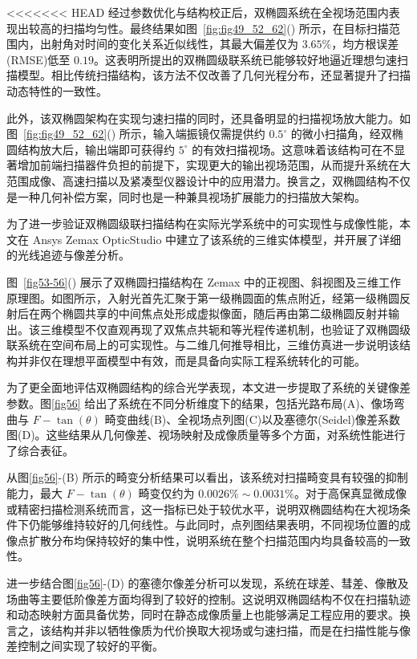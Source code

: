 <<<<<<< HEAD
经过参数优化与结构校正后，双椭圆系统在全视场范围内表现出较高的扫描均匀性。最终结果如图~\ref{fig:fig49_52_62}() 所示，在目标扫描范围内，出射角对时间的变化关系近似线性，其最大偏差仅为 $3.65\%$，均方根误差(RMSE)低至 $0.19$。这表明所提出的双椭圆级联系统已能够较好地逼近理想匀速扫描模型。相比传统扫描结构，该方法不仅改善了几何光程分布，还显著提升了扫描动态特性的一致性。

此外，该双椭圆架构在实现匀速扫描的同时，还具备明显的扫描视场放大能力。如图~\ref{fig:fig49_52_62}() 所示，输入端振镜仅需提供约 $0.5^\circ$ 的微小扫描角，经双椭圆结构放大后，输出端即可获得约 $5^\circ$ 的有效扫描视场。这意味着该结构可在不显著增加前端扫描器件负担的前提下，实现更大的输出视场范围，从而提升系统在大范围成像、高速扫描以及紧凑型仪器设计中的应用潜力。换言之，双椭圆结构不仅是一种几何补偿方案，同时也是一种兼具视场扩展能力的扫描放大架构。

为了进一步验证双椭圆级联扫描结构在实际光学系统中的可实现性与成像性能，本文在 Ansys Zemax OpticStudio 中建立了该系统的三维实体模型，并开展了详细的光线追迹与像差分析。

图~\ref{fig53-56}() 展示了双椭圆扫描结构在 Zemax 中的正视图、斜视图及三维工作原理图。如图所示，入射光首先汇聚于第一级椭圆面的焦点附近，经第一级椭圆反射后在两个椭圆共享的中间焦点处形成虚拟像面，随后再由第二级椭圆反射并输出。该三维模型不仅直观再现了双焦点共轭和等光程传递机制，也验证了双椭圆级联系统在空间布局上的可实现性。与二维几何推导相比，三维仿真进一步说明该结构并非仅在理想平面模型中有效，而是具备向实际工程系统转化的可能。

为了更全面地评估双椭圆结构的综合光学表现，本文进一步提取了系统的关键像差参数。图\ref{fig56} 给出了系统在不同分析维度下的结果，包括光路布局(A)、像场弯曲与 $F-\tan(\theta)$ 畸变曲线(B)、全视场点列图(C)以及塞德尔(Seidel)像差系数图(D)。这些结果从几何像差、视场映射及成像质量等多个方面，对系统性能进行了综合表征。

从图\ref{fig56}-(B) 所示的畸变分析结果可以看出，该系统对扫描畸变具有较强的抑制能力，最大 $F-\tan(\theta)$ 畸变仅约为 $0.0026\%\sim0.0031\%$。对于高保真显微成像或精密扫描检测系统而言，这一指标已处于较优水平，说明双椭圆结构在大视场条件下仍能够维持较好的几何线性。与此同时，点列图结果表明，不同视场位置的成像点扩散分布均保持较好的集中性，说明系统在整个扫描范围内均具备较高的一致性。

进一步结合图\ref{fig56}-(D) 的塞德尔像差分析可以发现，系统在球差、彗差、像散及场曲等主要低阶像差方面均得到了较好的控制。这说明双椭圆结构不仅在扫描轨迹和动态映射方面具备优势，同时在静态成像质量上也能够满足工程应用的要求。换言之，该结构并非以牺牲像质为代价换取大视场或匀速扫描，而是在扫描性能与像差控制之间实现了较好的平衡。

